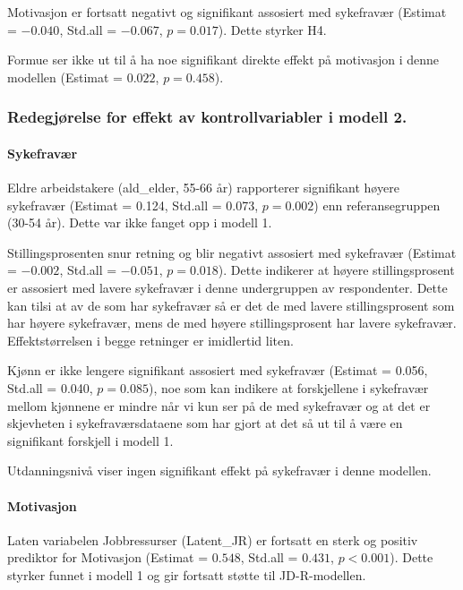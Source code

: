 \documentclass[
  12pt,
  a4paper,
  DIV=11,
  numbers=noendperiod]{scrartcl}
\let\oldparagraph\paragraph
\renewcommand{\paragraph}[1]{\oldparagraph{#1}\mbox{}}
\begin{document}
Motivasjon er fortsatt negativt og signifikant assosiert med sykefravær
(Estimat = \(-0.040\), Std.all = \(-0.067\), \(p = 0.017\)). Dette
styrker H4.

Formue ser ikke ut til å ha noe signifikant direkte effekt på motivasjon
i denne modellen (Estimat = \(0.022\), \(p = 0.458\)).

\subsubsection{Redegjørelse for effekt av kontrollvariabler i modell
2.}\label{redegjuxf8relse-for-effekt-av-kontrollvariabler-i-modell-2.}

\paragraph{Sykefravær}\label{sykefravuxe6r-2}

Eldre arbeidstakere (ald\_elder, 55-66 år) rapporterer signifikant
høyere sykefravær (Estimat = 0.124, Std.all = 0.073, \(p = 0.002\)) enn
referansegruppen (30-54 år). Dette var ikke fanget opp i modell 1.

Stillingsprosenten snur retning og blir negativt assosiert med
sykefravær (Estimat = \(-0.002\), Std.all = \(-0.051\), \(p = 0.018\)).
Dette indikerer at høyere stillingsprosent er assosiert med lavere
sykefravær i denne undergruppen av respondenter. Dette kan tilsi at av
de som har sykefravær så er det de med lavere stillingsprosent som har
høyere sykefravær, mens de med høyere stillingsprosent har lavere
sykefravær. Effektstørrelsen i begge retninger er imidlertid liten.

Kjønn er ikke lengere signifikant assosiert med sykefravær (Estimat =
0.056, Std.all = 0.040, \(p = 0.085\)), noe som kan indikere at
forskjellene i sykefravær mellom kjønnene er mindre når vi kun ser på de
med sykefravær og at det er skjevheten i sykefraværsdataene som har
gjort at det så ut til å være en signifikant forskjell i modell 1.

Utdanningsnivå viser ingen signifikant effekt på sykefravær i denne
modellen.

\paragraph{Motivasjon}\label{motivasjon-2}

Laten variabelen Jobbressurser (Latent\_JR) er fortsatt en sterk og
positiv prediktor for Motivasjon (Estimat = \(0.548\), Std.all =
\(0.431\), \(p < 0.001\)). Dette styrker funnet i modell 1 og gir
fortsatt støtte til JD-R-modellen.
\end{document}
